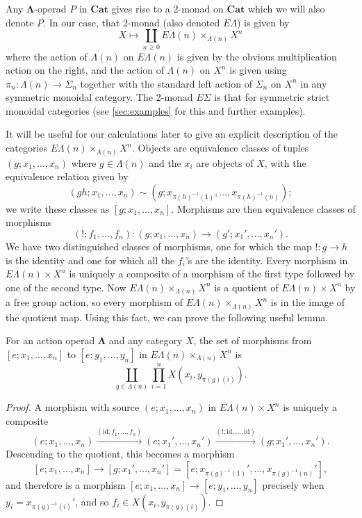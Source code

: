 \documentclass{amsbook} %
\newcommand{\mb}{\mathbf}
\newcommand{\id}{\textrm{id}}
\numberwithin{section}{chapter}
\begin{document}
Any $\mb{\Lambda}$-operad $P$ in $\mb{Cat}$ gives rise to a 2-monad on $\mb{Cat}$ which we will also denote $P$.  In our case, that 2-monad (also denoted $E\Lambda$) is given by
\[
X \mapsto \coprod_{n \geq 0} E\Lambda(n) \times_{\Lambda(n)} X^{n}
\]
where the action of $\Lambda(n)$ on $E\Lambda(n)$ is given by the obvious multiplication action on the right, and the action of $\Lambda(n)$ on $X^{n}$ is given using $\pi_{n}:\Lambda(n) \rightarrow \Sigma_{n}$ together with the standard left action of $\Sigma_{n}$ on $X^{n}$ in any symmetric monoidal category.  The 2-monad $E\Sigma$ is that for symmetric strict monoidal categories (see \cref{sec:examples} for this and further examples).

It will be useful for our calculations later to give an explicit description of the categories $E\Lambda(n) \times_{\Lambda(n)} X^{n}$.  Objects are equivalence classes of tuples $(g; x_1, \ldots, x_n)$ where $g \in \Lambda(n)$ and the $x_{i}$ are objects of $X$, with the equivalence relation given by
\[
(gh; x_1, \ldots, x_n) \sim (g; x_{\pi(h)^{-1}(1)}, \ldots, x_{\pi(h)^{-1}(n)});
\]
we write these classes as $[g; x_1, \ldots, x_n]$.  Morphisms are then equivalence classes of morphisms
\[
(!; f_1, \ldots, f_n): (g; x_1, \ldots, x_n) \to (g'; x_1', \ldots, x_n').
\]
We have two distinguished classes of morphisms, one for which the map $!: g \to h$ is the identity and one for which all the $f_{i}$'s are the identity.  Every morphism in $E\Lambda(n) \times X^{n}$ is uniquely a composite of a  morphism of the first type followed by one of the second type.  Now $E\Lambda(n) \times_{\Lambda(n)} X^{n}$ is a quotient of $E\Lambda(n) \times X^{n}$ by a free group action, so every morphism of $E\Lambda(n) \times_{\Lambda(n)} X^{n}$ is in the image of the quotient map.  Using this fact, we can prove the following useful lemma.

\begin{lem}\label{hom-set-lemma}
For an action operad $\mb{\Lambda}$ and any category $X$, the set of morphisms from $[e; x_1, \ldots, x_n]$ to $[e; y_1, \ldots, y_n]$ in $E\Lambda(n) \times_{\Lambda(n)} X^{n}$ is
\[
\coprod_{g \in \Lambda(n)} \prod_{i=1}^{n} X(x_i, y_{\pi(g)(i)}).
\]
\end{lem}
\begin{proof}
A morphism with source $(e; x_1, \ldots, x_n)$ in $E\Lambda(n) \times X^{n}$ is uniquely a composite
\[
(e; x_1, \ldots, x_n) \stackrel{(\id; f_{1}, \ldots, f_{n})}{\longrightarrow} (e; x_1', \ldots, x_n') \stackrel{(!; \id, \ldots, \id)}{\longrightarrow} (g; x_1', \ldots, x_n').
\]
Descending to the quotient, this becomes a morphism
\[
[e; x_1, \ldots, x_n] \to [g; x_1', \ldots, x_n'] = [e; x_{\pi(g)^{-1}(1)}', \ldots, x_{\pi(g)^{-1}(n)}'],
\]
and therefore is a morphism $[e; x_1, \ldots, x_n] \to [e; y_1, \ldots, y_n]$ precisely when $y_i = x_{\pi(g)^{-1}(i)}'$, and so $f_i \in   X(x_i, y_{\pi(g)(i)})$.
\end{proof}
\end{document}
